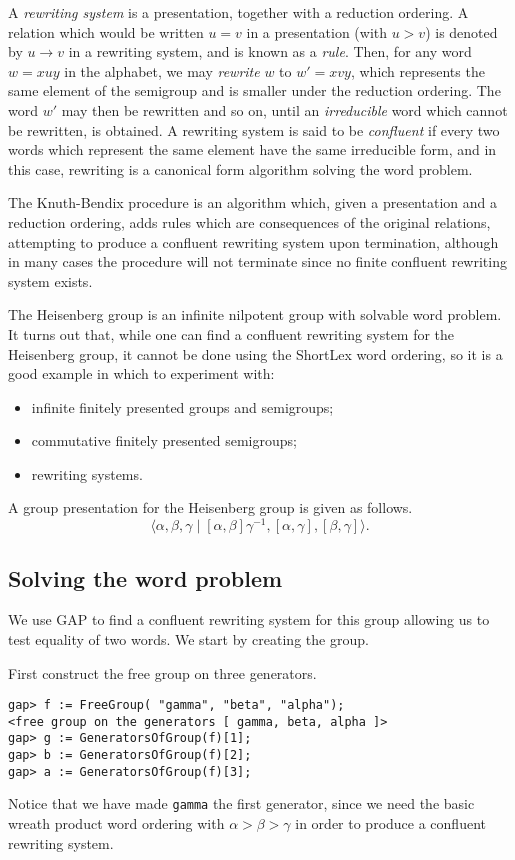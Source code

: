 \documentclass{ws-p8-50x6-00}
\theoremstyle{plain} \newtheorem{Thm}{Theorem}
\theoremstyle{plain} \newtheorem{Cor}{Corollary}
\theoremstyle{plain} \newtheorem{Lemma}{Lemma}
\theoremstyle{plain} \newtheorem{Prop}{Proposition}
\theoremstyle{plain} \newtheorem{Ex}{Exercise}
\def\gap{\sf GAP}
\begin{document}
A {\em rewriting system} is a presentation, together with
a reduction ordering. A relation which would be written $u=v$ 
in a presentation (with $u>v$) is denoted by 
$u \rightarrow v$ in a rewriting system, and is known as a {\em rule}.
Then, for any word $w = xuy$ in the alphabet, we may {\em rewrite} $w$  to 
$w' = xvy$, which represents the same element of the semigroup and 
is smaller under the reduction ordering. The word $w'$ may then be rewritten
and so on, until an {\em irreducible} word which cannot be rewritten, 
is obtained. A rewriting system is said to be {\em confluent} if
every two words which represent the same element have the same 
irreducible form,
and in this case, rewriting is a canonical form algorithm
solving the word problem.

The Knuth-Bendix procedure is an algorithm which, given a presentation
and a reduction ordering, adds rules which are consequences of the 
original relations,  attempting to produce a confluent rewriting system
upon termination, although in many cases the procedure will not terminate
since no finite confluent rewriting system exists.

The Heisenberg group is an infinite nilpotent group with
solvable word problem. It turns out that, while one can
find a confluent rewriting system for the Heisenberg group,
it cannot be done using the ShortLex word ordering, so
it is a good example in which to experiment with:
\begin{itemize}
\item infinite finitely presented groups and semigroups;
\item commutative finitely presented semigroups;
\item rewriting systems.
\end{itemize}

A group presentation for 
the Heisenberg group is given\cite{eps}  as follows. 
$$\langle \alpha ,\beta ,\gamma \mid 
[ \alpha ,\beta ] \gamma ^{-1} ,
[ \alpha ,\gamma ] , [ \beta ,\gamma ] \rangle .$$  

\subsection{Solving the word problem}
We use {\gap} to find a confluent rewriting system for 
this group allowing us to test equality of two words.
We start by creating the group. 

First construct the free group on three generators.
\begin{verbatim}
gap> f := FreeGroup( "gamma", "beta", "alpha");
<free group on the generators [ gamma, beta, alpha ]>
gap> g := GeneratorsOfGroup(f)[1];
gap> b := GeneratorsOfGroup(f)[2];
gap> a := GeneratorsOfGroup(f)[3];
\end{verbatim}
Notice that we have made {\tt gamma}  the first 
generator, since we need the basic wreath product 
word ordering with  $\alpha > \beta > \gamma$ 
in order to produce a confluent rewriting system.
\end{document}
